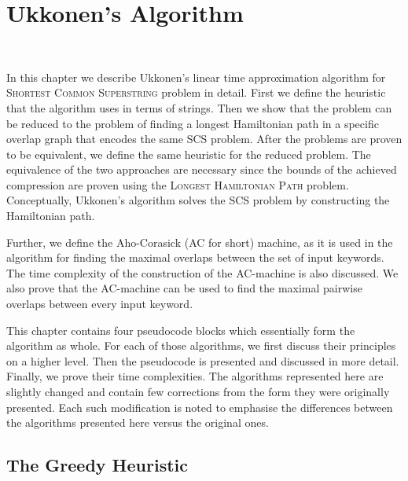 \documentclass[english,twoside,censored,csm,algorithms-track-2020]{HYthesisML}
\theoremstyle{plain}
\theoremstyle{definition}
\begin{document}






\chapter{Ukkonen's Algorithm}~\label{chp-ukkonen}

In this chapter we describe Ukkonen's linear time approximation algorithm \citep{Ukkonen90} for
\textsc{Shortest Common Superstring} problem in detail. First we define the heuristic that the
algorithm uses in terms of strings. Then we show that the problem can be reduced to the problem
of finding a longest Hamiltonian path in a specific overlap graph that encodes the same SCS problem.
After the problems are proven to be equivalent, we define the same heuristic for the reduced problem.
The equivalence of the two approaches are necessary since the bounds of the achieved compression
are proven using the \textsc{Longest Hamiltonian Path} problem. Conceptually, Ukkonen's algorithm 
solves the SCS problem by constructing the Hamiltonian path.

Further, we define the Aho-Corasick (AC for short) machine, as it is used in the algorithm for finding
the maximal overlaps between the set of input keywords. The time complexity of the construction of
the AC-machine is also discussed. We also prove that the AC-machine can be used to find the maximal
pairwise overlaps between every input keyword.

This chapter contains four pseudocode blocks which essentially form the algorithm as whole.
For each of those algorithms, we first discuss their principles on a higher level. Then the pseudocode
is presented and discussed in more detail. Finally, we prove their time complexities.
The algorithms represented here are slightly changed and contain few corrections from the form they
were originally presented. Each such modification is noted to emphasise the differences between
the algorithms presented here versus the original ones.

\listofalgorithms

\section{The Greedy Heuristic}
\end{document}
